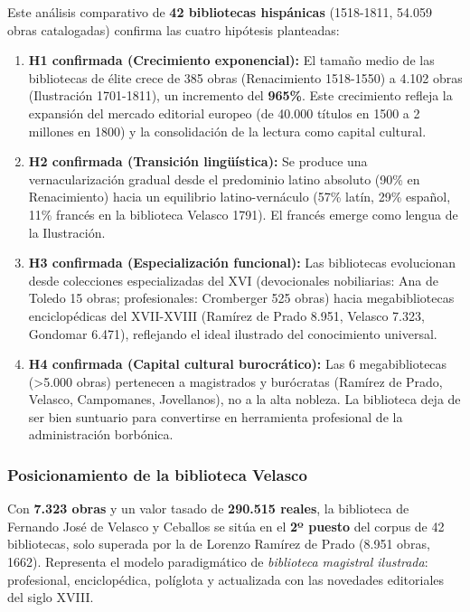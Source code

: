 \documentclass[12pt,a4paper]{article}
\begin{document}
Este análisis comparativo de \textbf{42 bibliotecas hispánicas} (1518-1811, 54.059 obras catalogadas) confirma las cuatro hipótesis planteadas:

\begin{enumerate}
\item \textbf{H1 confirmada (Crecimiento exponencial):} El tamaño medio de las bibliotecas de élite crece de 385 obras (Renacimiento 1518-1550) a 4.102 obras (Ilustración 1701-1811), un incremento del \textbf{965\%}. Este crecimiento refleja la expansión del mercado editorial europeo (de 40.000 títulos en 1500 a 2 millones en 1800) y la consolidación de la lectura como capital cultural.

\item \textbf{H2 confirmada (Transición lingüística):} Se produce una vernacularización gradual desde el predominio latino absoluto (90\% en Renacimiento) hacia un equilibrio latino-vernáculo (57\% latín, 29\% español, 11\% francés en la biblioteca Velasco 1791). El francés emerge como lengua de la Ilustración.

\item \textbf{H3 confirmada (Especialización funcional):} Las bibliotecas evolucionan desde colecciones especializadas del XVI (devocionales nobiliarias: Ana de Toledo 15 obras; profesionales: Cromberger 525 obras) hacia megabibliotecas enciclopédicas del XVII-XVIII (Ramírez de Prado 8.951, Velasco 7.323, Gondomar 6.471), reflejando el ideal ilustrado del conocimiento universal.

\item \textbf{H4 confirmada (Capital cultural burocrático):} Las 6 megabibliotecas (>5.000 obras) pertenecen a magistrados y burócratas (Ramírez de Prado, Velasco, Campomanes, Jovellanos), no a la alta nobleza. La biblioteca deja de ser bien suntuario para convertirse en herramienta profesional de la administración borbónica.
\end{enumerate}

\subsubsection{Posicionamiento de la biblioteca Velasco}

Con \textbf{7.323 obras} y un valor tasado de \textbf{290.515 reales}, la biblioteca de Fernando José de Velasco y Ceballos se sitúa en el \textbf{2º puesto} del corpus de 42 bibliotecas, solo superada por la de Lorenzo Ramírez de Prado (8.951 obras, 1662). Representa el modelo paradigmático de \textit{biblioteca magistral ilustrada}: profesional, enciclopédica, políglota y actualizada con las novedades editoriales del siglo XVIII.
\end{document}
